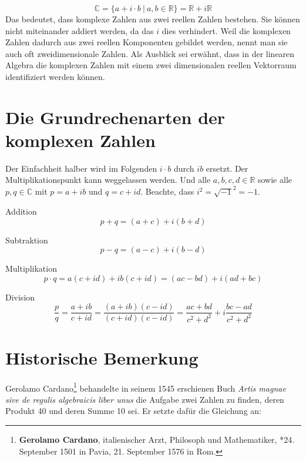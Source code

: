 \[ \mathbb{C} = \{ a+i\cdot b \ |\ a,b \in \mathbb{R} \} = \mathbb{R}+i\mathbb{R} \]
Das bedeutet, dass komplexe Zahlen aus zwei reellen Zahlen bestehen. Sie können nicht miteinander addiert werden, da das $i$ dies verhindert. Weil die komplexen Zahlen dadurch aus zwei reellen Komponenten gebildet werden, nennt man sie auch oft zweidimensionale Zahlen. Als Ausblick sei erwähnt, dass in der linearen Algebra die komplexen Zahlen mit einem zwei dimensionalen reellen Vektorraum identifiziert werden können.

\section{Die Grundrechenarten der komplexen Zahlen}

Der Einfachheit halber wird im Folgenden $i\cdot b$ durch $ib$ ersetzt. Der Multiplikationspunkt kann weggelassen werden. Und alle $a,b,c,d \in \mathbb{R}$ sowie alle $p,q \in \mathbb{C}$ mit $p = a+ib$ und $q = c+id$. Beachte, dass $i^2=\sqrt{-1}^2 = -1$.

\begin{definition} Addition
\[ p+q = (a+c)+i(b+d)\]
\end{definition}

\begin{definition} Subtraktion
\[ p-q = (a-c)+i(b-d)\]
\end{definition}

\begin{definition} Multiplikation
\[ p\cdot q = a(c+id)+ib(c+id) = (ac-bd)+i(ad+bc)  \]
\end{definition}

\begin{definition} Division
\[ \frac{p}{q} = \frac{a+ib}{c+id} = \frac{(a+ib)(c-id)}{(c+id)(c-id)} = \frac{ac+bd}{c^2+d^2} + i\frac{bc-ad}{c^2+d^2}\]
\end{definition}

\section{Historische Bemerkung} 

Gerolamo Cardano\footnote{\textbf{Gerolamo Cardano}, italienischer Arzt, Philosoph und Mathematiker, *24. September 1501 in Pavia, 21. September 1576 in Rom.} behandelte in seinem 1545 erschienen Buch \textit{Artis magnae sive de regulis algebraicis liber unus} die Aufgabe zwei Zahlen zu finden, deren Produkt 40 und deren Summe 10 sei. Er setzte dafür die Gleichung an:

